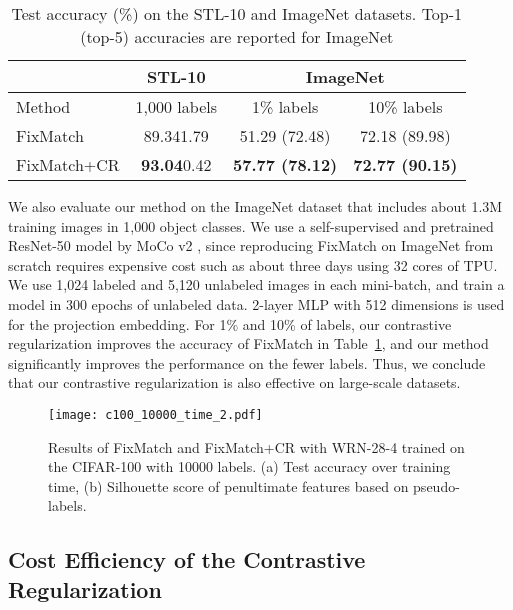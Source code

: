\documentclass[letterpaper]{article} \usepackage{aaai22}  \usepackage{times}  \usepackage{helvet}  \usepackage{courier}  \usepackage[hyphens]{url}  \usepackage{graphicx} \urlstyle{rm} \def\UrlFont{\rm}  \usepackage{natbib}  \usepackage{caption} \DeclareCaptionStyle{ruled}{labelfont=normalfont,labelsep=colon,strut=off} \frenchspacing  \setlength{\pdfpagewidth}{8.5in}  \setlength{\pdfpageheight}{11in}  \usepackage{algorithm}
\begin{document}
\begin{table}
\footnotesize
\centering
\caption{Test accuracy (\%) on the STL-10 and ImageNet datasets. Top-1 (top-5) accuracies are reported for ImageNet}
\begin{tabular}{l|c|cc}
\hline
 & STL-10 & \multicolumn{2}{c}{ImageNet} \\ \hline
Method     & 1,000 labels & 1\% labels & 10\% labels \\ \hline
FixMatch & 89.34\scriptsize{1.79} & 51.29 (72.48) & 72.18 (89.98) \\
FixMatch+CR & \textbf{93.04}\scriptsize{0.42} & \textbf{57.77 (78.12)} & \textbf{72.77 (90.15)} \\ \hline
\end{tabular}
\label{tab:ssl_stl_imagenet}
\vspace{-0.15in}
\end{table}

We also evaluate our method on the ImageNet dataset that includes about 1.3M training images in 1,000 object classes.
We use a self-supervised and pretrained ResNet-50 model by MoCo v2 \cite{he2020momentum,chen2020improved}, since reproducing FixMatch on ImageNet from scratch requires expensive cost such as about three days using 32 cores of TPU.
We use 1,024 labeled and 5,120 unlabeled images in each mini-batch, and train a model in 300 epochs of unlabeled data.
2-layer MLP with 512 dimensions is used for the projection embedding.
For 1\% and 10\% of labels, our contrastive regularization improves the accuracy of FixMatch in Table~\ref{tab:ssl_stl_imagenet}, and our method significantly improves the performance on the fewer labels.
Thus, we conclude that our contrastive regularization is also effective on large-scale datasets.

\begin{figure}
\centering
\texttt{[image: c100\_10000\_time\_2.pdf]}
\caption{Results of FixMatch and FixMatch+CR with WRN-28-4 trained on the CIFAR-100 with 10000 labels. (a) Test accuracy over training time, (b) Silhouette score of penultimate features based on pseudo-labels.}
\label{fig:emp_c100_w4}
\vspace{-0.1in}
\end{figure}


\subsection{Cost Efficiency of the Contrastive Regularization} \label{sec:efficiency}
\end{document}
